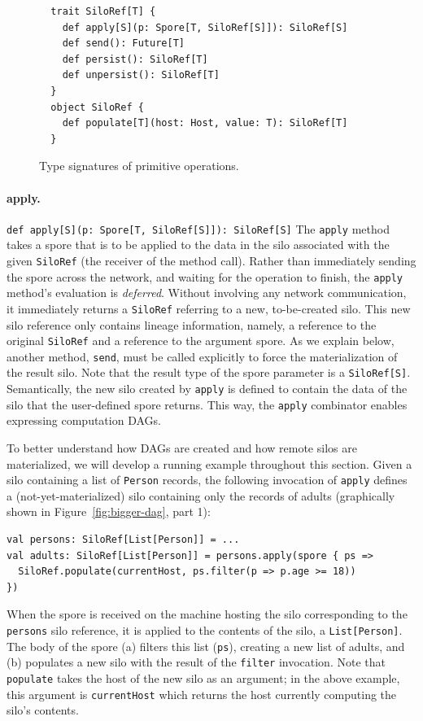 \documentclass{jfp1}
\begin{document}
\begin{figure}
\centering
\begin{lstlisting}
  trait SiloRef[T] {
    def apply[S](p: Spore[T, SiloRef[S]]): SiloRef[S]
    def send(): Future[T]
    def persist(): SiloRef[T]
    def unpersist(): SiloRef[T]
  }
  object SiloRef {
    def populate[T](host: Host, value: T): SiloRef[T]
  }
\end{lstlisting}
\caption{Type signatures of primitive operations.}\label{fig:signatures}
\end{figure}


\paragraph{apply.}%
%
\texttt{def apply[S](p: Spore[T, SiloRef[S]]): SiloRef[S]} \newline
%
The \verb|apply| method takes a spore that is to be applied to the
data in the silo associated with the given \verb|SiloRef| (\ie the
receiver of the method call). Rather than immediately sending the
spore across the network, and waiting for the operation to finish, the
\verb|apply| method's evaluation is {\em deferred}. Without involving
any network communication, it immediately returns a \verb|SiloRef|
referring to a new, to-be-created silo. This new silo reference only
contains lineage information, namely, a reference to the original
\verb|SiloRef| and a reference to the argument spore. As we explain
below, another method, \verb|send|, must be called explicitly to force
the materialization of the result silo. Note that the result type of
the spore parameter is a \verb|SiloRef[S]|. Semantically, the new silo
created by \verb|apply| is defined to contain the data of the silo
that the user-defined spore returns. This way, the \verb|apply|
combinator enables expressing computation DAGs.

To better understand how DAGs are created and how remote silos are
materialized, we will develop a running example throughout this
section. Given a silo containing a list of \verb|Person| records, the
following invocation of \verb|apply| defines a (not-yet-materialized)
silo containing only the records of adults (graphically shown in
Figure~\ref{fig:bigger-dag}, part 1):

\begin{lstlisting}
val persons: SiloRef[List[Person]] = ...
val adults: SiloRef[List[Person]] = persons.apply(spore { ps =>
  SiloRef.populate(currentHost, ps.filter(p => p.age >= 18))
})
\end{lstlisting}
\noindent
When the spore is received on the machine hosting the silo
corresponding to the \verb|persons| silo reference, it is applied to
the contents of the silo, a \verb|List[Person]|. The body of the spore
(a) filters this list (\verb|ps|), creating a new list of adults, and
(b) populates a new silo with the result of the \verb|filter|
invocation. Note that \verb|populate| takes the host of the new silo
as an argument; in the above example, this argument is
\verb|currentHost| which returns the host currently computing the
silo's contents.
\end{document}
